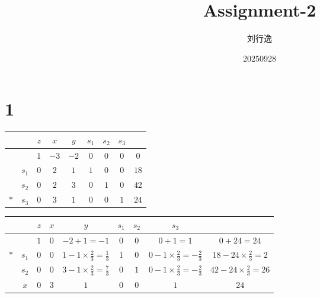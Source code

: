 \documentclass[a4paper,12pt]{article}
\title{Assignment-2}
\author{刘行逸}
\date{20250928}
\begin{document}
\maketitle

\section*{1}
\begin{table}[h]
    \scriptsize
    \begin{tabular}{cc|cccccc|c}
            &       & $z$ & $x$  & $y$  & $s_1$ & $s_2$ & $s_3$ &      \\
        \hline
            &       & $1$ & $-3$ & $-2$ & $0$   & $0$   & $0$   & $0$  \\
        \hline
            & $s_1$ & $0$ & $2$  & $1$  & $1$   & $0$   & $0$   & $18$ \\
            & $s_2$ & $0$ & $2$  & $3$  & $0$   & $1$   & $0$   & $42$ \\
        $*$ & $s_3$ & $0$ & $3$  & $1$  & $0$   & $0$   & $1$   & $24$ \\
    \end{tabular}
\end{table}

\begin{table}[h]
    \scriptsize
    \begin{tabular}{cc|cccccc|c}
            &       & $z$ & $x$ & $y$                                      & $s_1$ & $s_2$ & $s_3$                                     &                                   \\
        \hline
            &       & $1$ & $0$ & $-2 + 1 = -1$                            & $0$   & $0$   & $0 + 1 = 1$                               & $0 + 24 = 24$                     \\
        \hline
        $*$ & $s_1$ & $0$ & $0$ & $1 - 1 \times \frac{2}{3} = \frac{1}{3}$ & $1$   & $0$   & $0 - 1 \times \frac{2}{3} = -\frac{2}{3}$ & $18 - 24 \times \frac{2}{3} = 2$  \\
            & $s_2$ & $0$ & $0$ & $3 - 1 \times \frac{2}{3} = \frac{7}{3}$ & $0$   & $1$   & $0 - 1 \times \frac{2}{3} = -\frac{2}{3}$ & $42 - 24 \times \frac{2}{3} = 26$ \\
            & $x$   & $0$ & $3$ & $1$                                      & $0$   & $0$   & $1$                                       & $24$                              \\
    \end{tabular}
\end{table}
\end{document}

